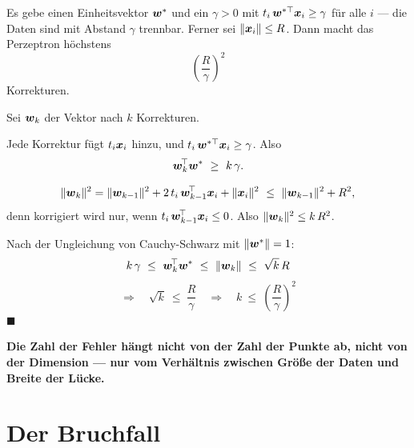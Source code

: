 \begin{merksatz}
Es gebe einen Einheitsvektor $\boldsymbol{w}^{*}$ und ein $\gamma > 0$ mit $t_i\,\boldsymbol{w}^{*\top}\boldsymbol{x}_i \ge \gamma$ für alle $i$ --- die Daten sind mit Abstand $\gamma$ trennbar. Ferner sei $\|\boldsymbol{x}_i\| \le R$. Dann macht das Perzeptron höchstens
\[ \left(\frac{R}{\gamma}\right)^{2} \]
Korrekturen.

Sei $\boldsymbol{w}_k$ der Vektor nach $k$ Korrekturen.

 Jede Korrektur fügt $t_i\boldsymbol{x}_i$ hinzu, und $t_i\,\boldsymbol{w}^{*\top}\boldsymbol{x}_i \ge \gamma$. Also
\[ \boldsymbol{w}_k^{\!\top}\boldsymbol{w}^{*} \ \ge\ k\,\gamma . \]

\[ \|\boldsymbol{w}_{k}\|^{2} = \|\boldsymbol{w}_{k-1}\|^{2} + 2\,t_i\,\boldsymbol{w}_{k-1}^{\!\top}\boldsymbol{x}_i + \|\boldsymbol{x}_i\|^{2} \ \le\ \|\boldsymbol{w}_{k-1}\|^{2} + R^{2} , \]
denn korrigiert wird nur, wenn $t_i\,\boldsymbol{w}_{k-1}^{\!\top}\boldsymbol{x}_i \le 0$. Also $\|\boldsymbol{w}_k\|^{2} \le k\,R^{2}$.

 Nach der Ungleichung von Cauchy-Schwarz mit $\|\boldsymbol{w}^{*}\| = 1$:
\[ k\,\gamma \ \le\ \vek w_k^{\!\top}\vek w^{*} \ \le\ \|\vek w_k\| \ \le\ \sqrt k\,R \]
\[ \Longrightarrow\quad \sqrt k \ \le\ \frac{R}{\gamma} \quad\Longrightarrow\quad k \ \le\ \left(\frac{R}{\gamma}\right)^{2} \]
$\blacksquare$

\begin{center}
\begin{minipage}{0.9\textwidth}
\textbf{Die Zahl der Fehler hängt nicht von der Zahl der Punkte ab, nicht von der Dimension --- nur vom Verhältnis zwischen Größe der Daten und Breite der Lücke.}
\end{minipage}
\end{center}

\begin{center}
\begin{minipage}{0.88\textwidth}
\end{minipage}
\end{center}
\end{merksatz}

\section{Der Bruchfall}

